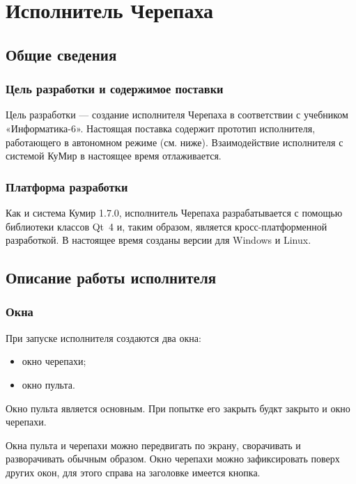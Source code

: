 \chapter*{Исполнитель Черепаха}
\addtocounter{chapter}{1}

\section{Общие сведения}

\subsection{Цель разработки и содержимое поставки}

Цель разработки --- создание исполнителя Черепаха в соответствии с учебником «Инфор\-ма\-тика-6». Настоящая поставка содержит прототип исполнителя, работающего в автономном режиме (см. ниже). Взаимодействие исполнителя с системой КуМир в настоящее время отлаживается.
 
\subsection{Платформа разработки}

Как и система Кумир 1.7.0, исполнитель Черепаха разрабатывается с помощью библиотеки классов Qt~4 и, таким образом, является кросс-платформенной разработкой. В настоящее время созданы версии для Windows и Linux. 

\section{Описание работы исполнителя}

\subsection{Окна}

При запуске исполнителя создаются два окна:
\begin{itemize}
\item окно черепахи;
\item окно пульта.
\end{itemize}

Окно пульта является основным. При попытке его закрыть будкт закрыто и окно черепахи.


	
Окна пульта и черепахи можно передвигать по экрану, сворачивать и разворачивать обычным образом. Окно черепахи можно зафиксировать поверх других окон, для этого справа на заголовке имеется кнопка.

